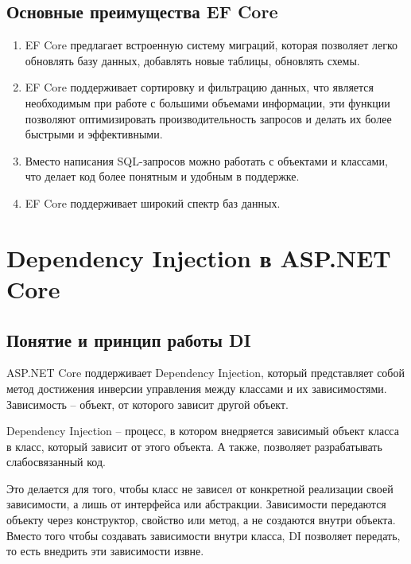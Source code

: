 \documentclass[a4paper,12pt]{report}
\begin{document}
\subsection{Основные преимущества \acs{EF} Core}

\begin{enumerate}
    \item
        \acs{EF} Core предлагает встроенную систему миграций, которая позволяет легко 
        обновлять базу данных, добавлять новые таблицы, обновлять схемы.
    \item
        \acs{EF} Core поддерживает сортировку и фильтрацию данных, 
        что является необходимым при работе с большими объемами информации, эти функции позволяют оптимизировать производительность 
        запросов и делать их более быстрыми и эффективными.
    \item
        Вместо написания \acs{SQL}-запросов можно работать с объектами и классами, 
        что делает код более понятным и удобным в поддержке.
    \item
        \acs{EF} Core поддерживает широкий спектр баз данных.
\end{enumerate}

\section{Dependency Injection в ASP.NET Core}

\subsection{Понятие и принцип работы \acs{DI}}

ASP.NET Core поддерживает Dependency Injection, который представляет собой метод достижения инверсии управления 
между классами и их зависимостями. Зависимость -- объект, от которого зависит другой объект.

Dependency Injection -- процесс, в котором внедряется зависимый объект класса в класс, который зависит от этого объекта.
А также, позволяет разрабатывать слабосвязанный код. 

Это делается для того, чтобы класс не зависел от конкретной реализации своей зависимости, 
а лишь от интерфейса или абстракции. Зависимости передаются объекту через конструктор, свойство или метод, а не создаются внутри объекта. 
Вместо того чтобы создавать зависимости внутри класса, \acs{DI} позволяет передать, то есть внедрить эти зависимости извне.\cite{dependency_injection}
\end{document}
